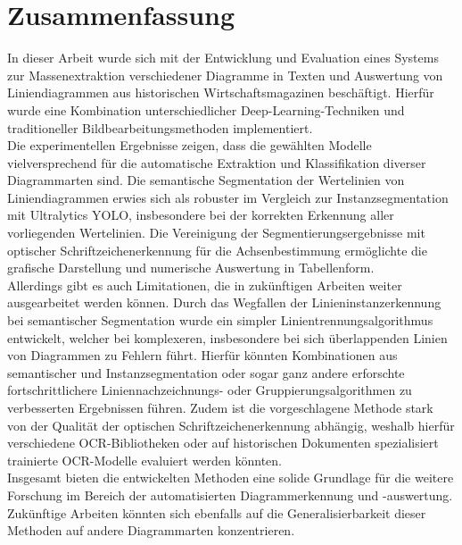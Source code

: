\chapter{Zusammenfassung}
\label{ch:zusammenfassung}

In dieser Arbeit wurde sich mit der Entwicklung und Evaluation eines Systems zur Massenextraktion verschiedener Diagramme in Texten und Auswertung von Liniendiagrammen aus historischen Wirtschaftsmagazinen beschäftigt. Hierfür wurde eine Kombination unterschiedlicher Deep-Learning-Techniken und traditioneller Bildbearbeitungsmethoden implementiert.
\\
Die experimentellen Ergebnisse zeigen, dass die gewählten Modelle vielversprechend für die automatische Extraktion und Klassifikation diverser Diagrammarten sind. Die semantische Segmentation der Wertelinien von Liniendiagrammen erwies sich als robuster im Vergleich zur Instanzsegmentation mit Ultralytics YOLO, insbesondere bei der korrekten Erkennung aller vorliegenden Wertelinien. Die Vereinigung der Segmentierungsergebnisse mit optischer Schriftzeichenerkennung für die Achsenbestimmung ermöglichte die grafische Darstellung und numerische Auswertung in Tabellenform.
\\
Allerdings gibt es auch Limitationen, die in zukünftigen Arbeiten weiter ausgearbeitet werden können. Durch das Wegfallen der Linieninstanzerkennung bei semantischer Segmentation wurde ein simpler Linientrennungsalgorithmus entwickelt, welcher bei komplexeren, insbesondere bei sich überlappenden Linien von Diagrammen zu Fehlern führt. Hierfür könnten Kombinationen aus semantischer und Instanzsegmentation oder sogar ganz andere erforschte fortschrittlichere Liniennachzeichnungs- oder Gruppierungsalgorithmen zu verbesserten Ergebnissen führen. Zudem ist die vorgeschlagene Methode stark von der Qualität der optischen Schriftzeichenerkennung abhängig, weshalb hierfür verschiedene OCR-Bibliotheken oder auf historischen Dokumenten spezialisiert trainierte OCR-Modelle evaluiert werden könnten.
\\
Insgesamt bieten die entwickelten Methoden eine solide Grundlage für die weitere Forschung im Bereich der automatisierten Diagrammerkennung und -auswertung. Zukünftige Arbeiten könnten sich ebenfalls auf die Generalisierbarkeit dieser Methoden auf andere Diagrammarten konzentrieren.